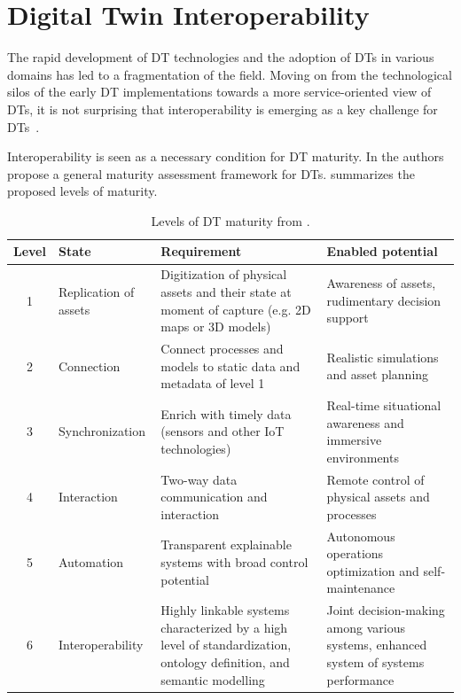 \section{Digital Twin Interoperability}
\label{sec:back:dt:interoperability}

The rapid development of \ac{DT} technologies and the adoption of \acp{DT} in various domains has led to a fragmentation of the field. 
%
Moving on from the technological silos of the early \ac{DT} implementations towards a more service-oriented view of \acp{DT},
it is not surprising that interoperability is emerging as a key challenge for \acp{DT}~\cite{piroumian2021interoperability,Rebelo_Moreira_2024}. 


Interoperability is seen as a necessary condition for \ac{DT} maturity.
In \cite{Klar_Arvidsson_Angelakis_2024} the authors propose a general maturity assessment framework for \acp{DT}. 
 summarizes the proposed levels of maturity.


\begin{table}[htbp]
\centering
\renewcommand{\arraystretch}{1.2}
\begin{tabular}{c|p{2.8cm}|p{5cm}|p{4cm}}
\toprule
\midrule
\textbf{Level} & \textbf{State} & \textbf{Requirement} & \textbf{Enabled potential} \\
\midrule
\toprule
1 & Replication of assets & 
Digitization of physical assets and their state at moment of capture (e.g. 2D maps or 3D models) & 
Awareness of assets, rudimentary decision support \\
\hline
2 & Connection & 
Connect processes and models to static data and metadata of level 1 & 
Realistic simulations and asset planning \\
\hline
3 & Synchronization & 
Enrich with timely data (sensors and other IoT technologies) & 
Real-time situational awareness and immersive environments \\
\hline
4 & Interaction & 
Two-way data communication and interaction & 
Remote control of physical assets and processes \\
\hline
5 & Automation & 
Transparent explainable systems with broad control potential & 
Autonomous operations optimization and self-maintenance \\
\hline
6 & Interoperability & 
Highly linkable systems characterized by a high level of standardization, ontology definition, and semantic modelling & 
Joint decision-making among various systems, enhanced system of systems performance \\
\midrule
\bottomrule
\end{tabular}
\caption{Levels of \acl{DT} maturity from \cite{Klar_Arvidsson_Angelakis_2024}.}
\label{tab:dt-maturity}
\end{table}

